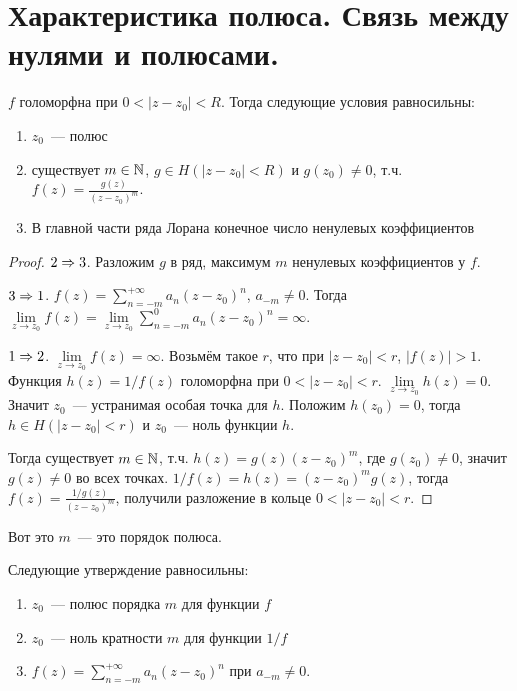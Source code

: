 \section{Характеристика полюса. Связь между нулями и полюсами.}

\begin{theorem}

    $f$ голоморфна при $0 < |z-z_0| < R$. Тогда
    следующие условия равносильны:

    \begin{enumerate}
        \item $z_0$~--- полюс
        \item существует $m \in \mathbb{N}$, $g \in H(|z-z_0|<R)$
              и $g(z_0) \ne 0$, т.ч. $f(z) = \frac{g(z)}{(z-z_0)^m}$.
        \item В главной части ряда Лорана конечное число
              ненулевых коэффициентов
    \end{enumerate}
\end{theorem}

\begin{proof}
    $2 \Rightarrow 3$. Разложим $g$ в ряд, максимум $m$ ненулевых
    коэффициентов у $f$.

    $3 \Rightarrow 1$.
    $f(z) = \sum\limits_{n=-m}^{+\infty} a_n(z-z_0)^n$,
    $a_{-m} \ne 0$. Тогда
    $\lim\limits_{z \to z_0} f(z) = \lim\limits_{z \to z_0} \sum\limits_{n=-m}^{0} a_n(z-z_0)^n
        = \infty$.

    $1 \Rightarrow 2$. $\lim\limits_{z \to z_0} f(z) = \infty$.
    Возьмём такое $r$, что при $|z-z_0| < r$, $|f(z)| > 1$.
    Функция $h(z) = 1/f(z)$ голоморфна при $0 < |z-z_0| < r$.
    $\lim\limits_{z\to z_0} h(z) = 0$. Значит $z_0$~--- устранимая
    особая точка для $h$. Положим $h(z_0) = 0$, тогда
    $h \in H(|z-z_0| < r)$ и $z_0$~--- ноль функции $h$.

    Тогда существует $m \in \mathbb{N}$, т.ч. $h(z) = g(z)(z-z_0)^m$,
    где $g(z_0) \ne 0$, значит $g(z) \ne 0$ во всех точках.
    $1/f(z) = h(z) = (z-z_0)^m g(z)$,
    тогда $f(z) = \frac{1/g(z)}{(z-z_0)^m}$, получили разложение
    в кольце $0 < |z-z_0| < r$.
\end{proof}

\begin{definition}
    Вот это $m$~--- это порядок полюса.
\end{definition}

\begin{observation}
    Следующие утверждение равносильны:

    \begin{enumerate}
        \item $z_0$~--- полюс порядка $m$ для функции $f$
        \item $z_0$~--- ноль кратности $m$ для функции $1/f$
        \item $f(z) = \sum\limits_{n=-m}^{+\infty} a_n(z-z_0)^n$ при $a_{-m} \ne 0$.
    \end{enumerate}
\end{observation}

\newpage